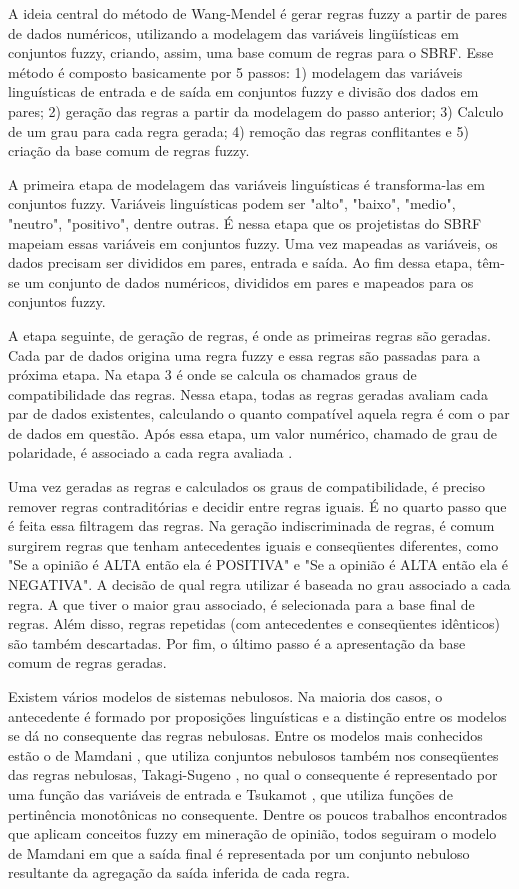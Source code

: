 \documentclass[template.tex]{subfiles}
\begin{document}
A ideia central do método de Wang-Mendel é gerar regras fuzzy a partir de pares de dados numéricos, utilizando a modelagem das variáveis lingüísticas em conjuntos fuzzy, criando, assim, uma base comum de regras para o SBRF. Esse método é composto basicamente por 5 passos: 1) modelagem das variáveis linguísticas de entrada e de saída em conjuntos fuzzy e divisão dos dados em pares; 2) geração das regras a partir da modelagem do passo anterior; 3) Calculo de um grau para cada regra gerada; 4) remoção das regras conflitantes e 5) criação da base comum de regras fuzzy.

A primeira etapa de modelagem das variáveis linguísticas é transforma-las em conjuntos fuzzy. Variáveis linguísticas podem ser "alto", "baixo", "medio", "neutro", "positivo", dentre outras. É nessa etapa que os projetistas do SBRF mapeiam essas variáveis em conjuntos fuzzy. Uma vez mapeadas as variáveis, os dados precisam ser divididos em pares, entrada e saída. Ao fim dessa etapa, têm-se um conjunto de dados numéricos, divididos em pares e mapeados para os conjuntos fuzzy. 

A etapa seguinte, de geração de regras, é onde as primeiras regras são geradas. Cada par de dados origina uma regra fuzzy e essa regras são passadas para a próxima etapa. Na etapa 3 é onde se calcula os chamados graus de compatibilidade das regras. Nessa etapa, todas as regras geradas avaliam cada par de dados existentes, calculando o quanto compatível aquela regra é com o par de dados em questão. Após essa etapa, um valor numérico, chamado de grau de polaridade, é associado a cada regra avaliada  \cite{wang1992generating}.

Uma vez geradas as regras e calculados os graus de compatibilidade, é preciso remover regras contraditórias e decidir entre regras iguais. É no quarto passo que é feita essa filtragem das regras. Na geração indiscriminada de regras, é comum surgirem regras que tenham antecedentes iguais e conseqüentes diferentes, como "Se a opinião é ALTA então ela é POSITIVA" e "Se a opinião é ALTA então ela é NEGATIVA". A decisão de qual regra utilizar é baseada no grau associado a cada regra. A que tiver o maior grau associado, é selecionada para a base final de regras. Além disso, regras repetidas (com antecedentes e conseqüentes idênticos) são também descartadas. Por fim, o último passo é a apresentação da base comum de regras geradas.

Existem vários modelos de sistemas nebulosos. Na maioria dos casos, o antecedente é formado por proposições linguísticas e a distinção entre os modelos se dá no consequente das regras nebulosas. Entre os modelos mais conhecidos estão o de Mamdani \cite{mamdani1975experiment}, que utiliza conjuntos nebulosos também nos conseqüentes das regras nebulosas, Takagi-Sugeno \cite{takagi1985fuzzy}, no qual o consequente é representado por uma função das variáveis de entrada e Tsukamot \cite{tsukamoto1979approach}, que utiliza funções de pertinência monotônicas no consequente. Dentre os poucos trabalhos encontrados que aplicam conceitos fuzzy em mineração de opinião, todos seguiram o modelo de Mamdani em que a saída final é representada por um conjunto nebuloso resultante da agregação da saída inferida de cada regra.
\end{document}
